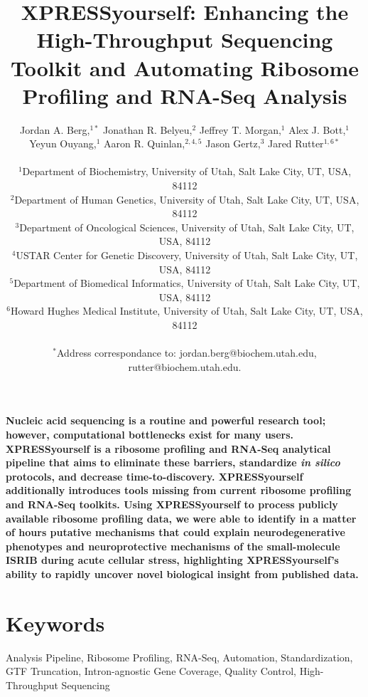 \documentclass[10pt, oneside]{article}
\title{
XPRESSyourself: Enhancing the High-Throughput Sequencing Toolkit and Automating Ribosome Profiling and RNA-Seq Analysis
}
\author{
Jordan A. Berg,$^{1\ast}$ Jonathan R. Belyeu,$^{2}$ Jeffrey T. Morgan,$^{1}$ Alex J. Bott,$^{1}$ \\
Yeyun Ouyang,$^{1}$ Aaron R. Quinlan,$^{2,4,5}$ Jason Gertz,$^{3}$ Jared Rutter$^{1,6\ast}$ \\
\\
\normalsize{$^{1}$Department of Biochemistry, University of Utah, Salt Lake City, UT, USA, 84112}\\
\normalsize{$^{2}$Department of Human Genetics, University of Utah, Salt Lake City, UT, USA, 84112}\\
\normalsize{$^{3}$Department of Oncological Sciences, University of Utah, Salt Lake City, UT, USA, 84112}\\
\normalsize{$^{4}$USTAR Center for Genetic Discovery, University of Utah, Salt Lake City, UT, USA, 84112}\\
\normalsize{$^{5}$Department of Biomedical Informatics, University of Utah, Salt Lake City, UT, USA, 84112}\\
\normalsize{$^{6}$Howard Hughes Medical Institute, University of Utah, Salt Lake City, UT, USA, 84112}\\
\\
\normalsize{$^\ast$Address correspondance to: jordan.berg@biochem.utah.edu, rutter@biochem.utah.edu.}\\
}
\date{}
\begin{document}
\baselineskip24pt

\maketitle

\textbf{Nucleic acid sequencing is a routine and powerful research tool; however, computational bottlenecks exist for many users. XPRESSyourself is a ribosome profiling and RNA-Seq analytical pipeline that aims to eliminate these barriers, standardize \textit{in silico} protocols, and decrease time-to-discovery. XPRESSyourself additionally introduces tools missing from current ribosome profiling and RNA-Seq toolkits. Using XPRESSyourself to process publicly available ribosome profiling data, we were able to identify in a matter of hours putative mechanisms that could explain neurodegenerative phenotypes and neuroprotective mechanisms of the small-molecule ISRIB during acute cellular stress, highlighting XPRESSyourself's ability to rapidly uncover novel biological insight from published data.}

\setlength{\parindent}{2em}

\section*{Keywords}
Analysis Pipeline, Ribosome Profiling, RNA-Seq, Automation, Standardization, GTF Truncation, Intron-agnostic Gene Coverage, Quality Control, High-Throughput Sequencing
\end{document}
